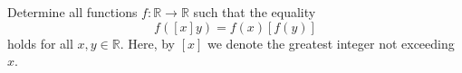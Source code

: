 Determine all functions $f : \mathbb{R} \to \mathbb{R}$ such that the equality
\[ f([x]y) = f(x)[f(y)] \tag{1} \]
holds for all $x, y \in \mathbb{R}$. Here, by $[x]$ we denote the greatest integer not exceeding $x$.
